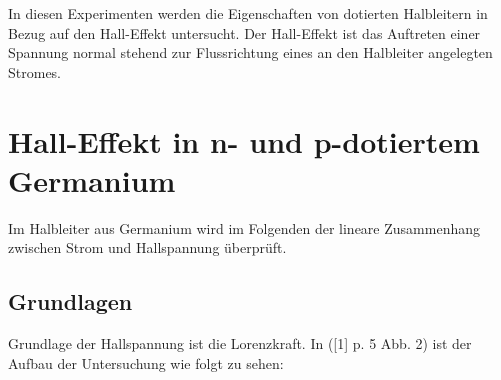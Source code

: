 \documentclass[12pt,a4paper]{article}
\begin{document}
\begin{multicols}{2}




%			



In diesen Experimenten werden die Eigenschaften von dotierten Halbleitern in Bezug auf den Hall-Effekt untersucht. Der Hall-Effekt ist das Auftreten einer Spannung normal stehend zur Flussrichtung eines an den Halbleiter angelegten Stromes.\\


\section{Hall-Effekt in n- und p-dotiertem Germanium}
Im Halbleiter aus Germanium wird im Folgenden der lineare Zusammenhang zwischen Strom und Hallspannung überprüft.

\subsection{Grundlagen}
Grundlage der Hallspannung ist die Lorenzkraft. In ([1] p. 5 Abb. 2) ist der Aufbau der Untersuchung wie folgt zu sehen:


\end{multicols}
\end{document}
